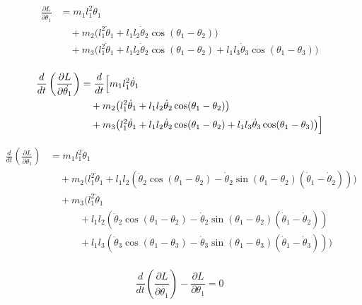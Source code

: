 \documentclass[11pt,a4paper]{article}
\begin{document}
\begin{align*}
    \frac{\partial L}{\partial \dot\theta_1} &= m_1 l_1^2 \dot{\theta}_1 \\
    &\quad + m_2 \big( l_1^2 \dot{\theta}_1 + l_1 l_2 \dot{\theta}_2 \cos(\theta_1 - \theta_2) \big) \\
    &\quad + m_3 \big( l_1^2 \dot{\theta}_1 + l_1 l_2 \dot{\theta}_2 \cos(\theta_1 - \theta_2) + l_1 l_3 \dot{\theta}_3 \cos(\theta_1 - \theta_3) \big) \\
\end{align*}

\begin{align*}
    \frac{d}{dt} \left( \frac{\partial L}{\partial \dot{\theta_1}} \right) &= 
    \frac{d}{dt} \Bigl[ m_1 l_1^2 \dot{\theta}_1 \\
    &\quad + m_2 \big( l_1^2 \dot{\theta}_1 + l_1 l_2 \dot{\theta}_2 \cos(\theta_1 - \theta_2) \big) \\
    &\quad + m_3 \big( l_1^2 \dot{\theta}_1 + l_1 l_2 \dot{\theta}_2 \cos(\theta_1 - \theta_2) + l_1 l_3 \dot{\theta}_3 \cos(\theta_1 - \theta_3) \big) \Bigr]
\end{align*}

\begin{align*}
    \frac{d}{dt} \left( \frac{\partial L}{\partial \dot{\theta_1}} \right) &= 
    m_1 l_1^2 \ddot{\theta}_1 \\
    &\quad + m_2 \big( l_1^2 \ddot{\theta}_1 + l_1 l_2 (\ddot{\theta}_2 \cos(\theta_1 - \theta_2) - \dot{\theta}_2 \sin(\theta_1 - \theta_2)(\dot\theta_1 - \dot\theta_2)) \big) \\
    &\quad + m_3 \big( l_1^2 \ddot{\theta}_1 \\
    &\qquad\quad + l_1 l_2 (\ddot{\theta}_2 \cos(\theta_1 - \theta_2) - \dot{\theta}_2 \sin(\theta_1 - \theta_2)(\dot\theta_1 - \dot\theta_2)) \\
    &\qquad\quad + l_1 l_3 (\ddot{\theta}_3 \cos(\theta_1 - \theta_3) - \dot{\theta}_3 \sin(\theta_1 - \theta_3)(\dot\theta_1 - \dot\theta_3))\big) \\
\end{align*}

\[ \frac{d}{dt} \left( \frac{\partial L}{\partial \dot{\theta_1}} \right) - \frac{\partial L}{\partial \theta_1} = 0 \]
\end{document}
